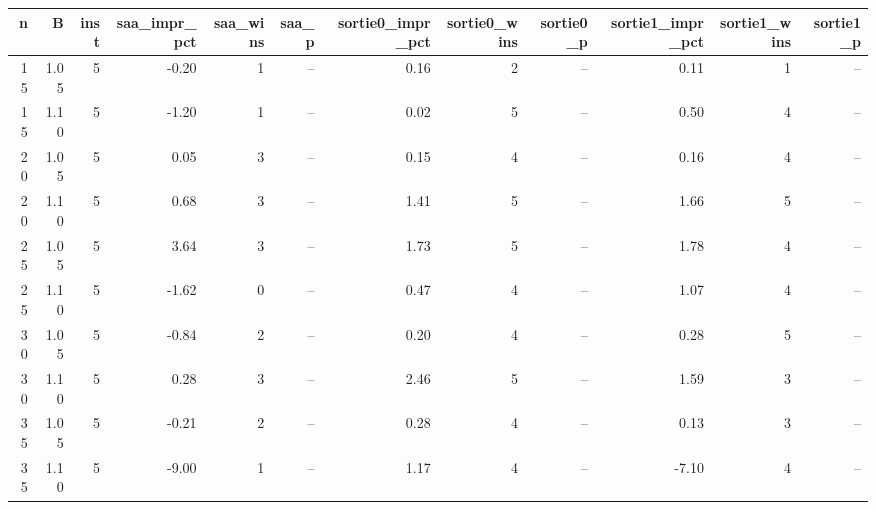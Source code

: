 \begin{tabular}{rrrrrrrrrrrr}
\toprule
n & B & inst & saa_impr_pct & saa_wins & saa_p & sortie0_impr_pct & sortie0_wins & sortie0_p & sortie1_impr_pct & sortie1_wins & sortie1_p \\
\midrule
15 & 1.05 & 5 & -0.20 & 1 & -- & 0.16 & 2 & -- & 0.11 & 1 & -- \\
15 & 1.10 & 5 & -1.20 & 1 & -- & 0.02 & 5 & -- & 0.50 & 4 & -- \\
20 & 1.05 & 5 & 0.05 & 3 & -- & 0.15 & 4 & -- & 0.16 & 4 & -- \\
20 & 1.10 & 5 & 0.68 & 3 & -- & 1.41 & 5 & -- & 1.66 & 5 & -- \\
25 & 1.05 & 5 & 3.64 & 3 & -- & 1.73 & 5 & -- & 1.78 & 4 & -- \\
25 & 1.10 & 5 & -1.62 & 0 & -- & 0.47 & 4 & -- & 1.07 & 4 & -- \\
30 & 1.05 & 5 & -0.84 & 2 & -- & 0.20 & 4 & -- & 0.28 & 5 & -- \\
30 & 1.10 & 5 & 0.28 & 3 & -- & 2.46 & 5 & -- & 1.59 & 3 & -- \\
35 & 1.05 & 5 & -0.21 & 2 & -- & 0.28 & 4 & -- & 0.13 & 3 & -- \\
35 & 1.10 & 5 & -9.00 & 1 & -- & 1.17 & 4 & -- & -7.10 & 4 & -- \\
\bottomrule
\end{tabular}

